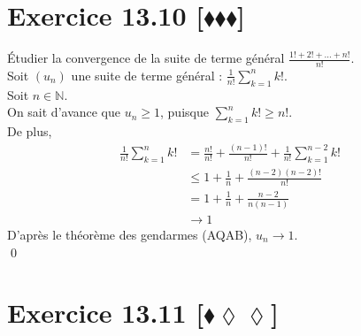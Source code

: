 \documentclass[10pt]{article}
\begin{document}
\section*{Exercice 13.10 [$\blacklozenge\blacklozenge\blacklozenge$]}
\begin{tcolorbox}[enhanced, width=7.6in, center, size=fbox, drop shadow southwest]
    Étudier la convergence de la suite de terme général $\frac{1! + 2! + ... + n!}{n!}$.\\
    Soit $(u_n)$ une suite de terme général : $\frac{1}{n!}\sum_{k=1}^nk!$.\\
    Soit $n\in\mathbb{N}$.\\
    On sait d'avance que $u_n \geq 1$, puisque $\sum_{k=1}^nk! \geq n!$.\\
    De plus,
    \begin{align*}
        \frac{1}{n!}\sum_{k=1}^nk! &= \frac{n!}{n!} + \frac{(n-1)!}{n!} + \frac{1}{n!}\sum_{k=1}^{n-2}k!\\
        &\leq 1 + \frac{1}{n} + \frac{(n-2)(n-2)!}{n!}\\
        &= 1 + \frac{1}{n} + \frac{n-2}{n(n-1)}\\
        &\longrightarrow 1 
    \end{align*}
    D'après le théorème des gendarmes (AQAB), $u_n \to 1$.\\
    \qed 
\end{tcolorbox}


\section*{Exercice 13.11 [$\blacklozenge\lozenge\lozenge$]}
\begin{tcolorbox}[enhanced, width=7.6in, center, size=fbox, drop shadow southwest]
    
\end{tcolorbox}
\end{document}
